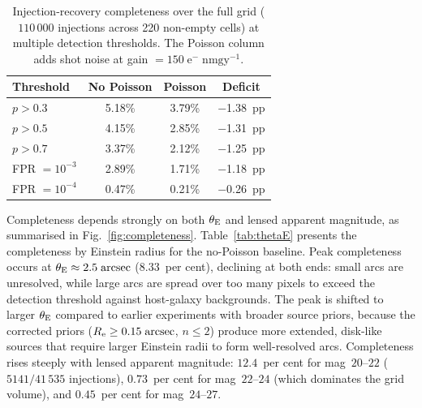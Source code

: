 \documentclass[fleqn,usenatbib]{rasti}
\begin{document}
\begin{table}
\caption{Injection-recovery completeness over the full grid ($110\,000$ injections across 220 non-empty cells) at multiple detection thresholds.  The Poisson column adds shot noise at gain $= 150\;\mathrm{e^{-}\;nmgy^{-1}}$.}
\label{tab:thresholds}
\centering
\begin{tabular}{lccc}
\toprule
Threshold & No Poisson & Poisson & Deficit \\
\midrule
$p > 0.3$ & 5.18\% & 3.79\% & $-$1.38~pp \\
$p > 0.5$ & 4.15\% & 2.85\% & $-$1.31~pp \\
$p > 0.7$ & 3.37\% & 2.12\% & $-$1.25~pp \\
FPR $= 10^{-3}$ & 2.89\% & 1.71\% & $-$1.18~pp \\
FPR $= 10^{-4}$ & 0.47\% & 0.21\% & $-$0.26~pp \\
\bottomrule
\end{tabular}
\end{table}

Completeness depends strongly on both $\theta_{\rm E}$ and lensed apparent magnitude, as summarised in Fig.~\ref{fig:completeness}.  Table~\ref{tab:thetaE} presents the completeness by Einstein radius for the no-Poisson baseline.  Peak completeness occurs at $\theta_{\rm E} \approx 2.5\;\mathrm{arcsec}$ ($8.33$~per cent), declining at both ends: small arcs are unresolved, while large arcs are spread over too many pixels to exceed the detection threshold against host-galaxy backgrounds.  The peak is shifted to larger $\theta_{\rm E}$ compared to earlier experiments with broader source priors, because the corrected priors ($R_{\rm e} \geq 0.15\;\mathrm{arcsec}$, $n \leq 2$) produce more extended, disk-like sources that require larger Einstein radii to form well-resolved arcs.  Completeness rises steeply with lensed apparent magnitude: $12.4$~per cent for mag~$20$--$22$ ($5141/41\,535$ injections), $0.73$~per cent for mag~$22$--$24$ (which dominates the grid volume), and $0.45$~per cent for mag~$24$--$27$.
\end{document}
